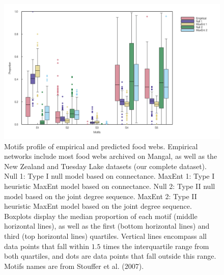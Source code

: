 \documentclass[11pt]{article}
\makeatletter
\def\maxwidth{\ifdim\Gin@nat@width>\linewidth\linewidth
\else\Gin@nat@width\fi}
\let\Oldincludegraphics\includegraphics
\renewcommand{\includegraphics}[1]{\Oldincludegraphics[width=\maxwidth]{#1}}
\makeatother
\begin{document}
\begin{figure}
\hypertarget{fig:motifs}{%
\centering
\includegraphics{figures/motifs_distribution.png}
\caption{Motifs profile of empirical and predicted food webs. Empirical
networks include most food webs archived on Mangal, as well as the New
Zealand and Tuesday Lake datasets (our complete dataset). Null 1: Type I
null model based on connectance. MaxEnt 1: Type I heuristic MaxEnt model
based on connectance. Null 2: Type II null model based on the joint
degree sequence. MaxEnt 2: Type II heuristic MaxEnt model based on the
joint degree sequence. Boxplots display the median proportion of each
motif (middle horizontal lines), as well as the first (bottom horizontal
lines) and third (top horizontal lines) quartiles. Vertical lines
encompass all data points that fall within \(1.5\) times the
interquartile range from both quartiles, and dots are data points that
fall outside this range. Motifs names are from Stouffer et al.
(2007).}\label{fig:motifs}
}
\end{figure}
\end{document}
